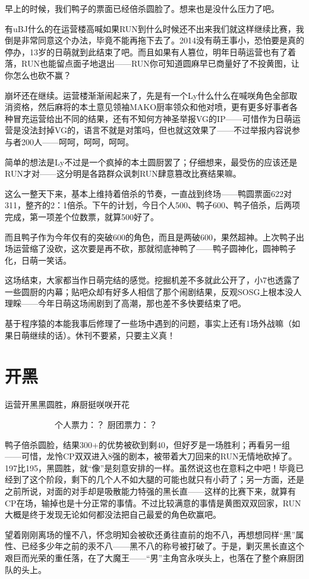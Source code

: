 早上的时候，我们鸭子的票面已经倍杀圆脸了。想来也是没什么压力了吧。

有uBJ什么的在运营楼高喊如果RUN到什么时候还不出来我们就这样继续比赛，我倒是非常同意这个办法，毕竟不能再拖下去了。2014没有萌王事小，恐怕要是真的停办，13岁的日萌就到此结束了吧。而且如果有人篡位，明年日萌运营也有了着落，RUN也能留点面子地退出——RUN你可知道圆麻早已商量好了不投黄图，让你怎么也砍不赢？

崩坏还在继续。运营楼渐渐闹起来了，先是有一个Ly什么什么在喊咲角色全部取消资格，然后麻将的本土意见领袖MAKO厨率领众和他对喷，更有更多好事者各种冒充运营给出不同的结果，还有不知何方神圣举报VG的IP——可惜作为日萌运营是没法封掉VG的，语言不就是对策吗，但也就这效果了——不过举报内容说参与者200人——呵呵，呵呵，呵呵。

简单的想法是Ly不过是一个疯掉的本土圆厨罢了；仔细想来，最受伤的应该还是RUN才对——这分明是各路群众讽刺RUN肆意篡改比赛结果嘛。

这么一整天下来，基本上维持着倍杀的节奏，一直战到终场——鸭圆票面622对311，整齐的2：1倍杀。下午的计划，今日个人500、鸭子600、鸭子倍杀，后两项完成，第一项差个位数票，就算500好了。

而且鸭子作为今年仅有的突破600的角色，而且是两破600，果然超神。上次鸭子出场运营缩了没砍，这次要是再不砍，那就彻底神鸭了——鸭子圆神化，圆神鸭子化，日萌一笑话。

这场结束，大家都当作日萌完结的感觉。挖掘机差不多就此公开了，小7也透露了一些圆厨的内幕；贴吧众却有好多人相信了那个闹剧结果，反观SOSG上根本没人理睬——今年日萌这场闹剧到了高潮，那也差不多快要结束了吧。

基于程序猿的本能我事后修理了一些场中遇到的问题，事实上还有1场外战嘛（如果日萌继续的话）。休刊不要紧，只要主义真！


\section{开黑}
运营开黑黑圆胜，麻厨挺咲咲开花

　　　　　　个人票力：？ 厨团票力：？

鸭子倍杀圆脸，结果300+的优势被砍到剩40，但好歹是一场胜利；再看另一组——可惜，龙怜CP双双进入8强的剧本，被带着大刀回来的RUN无情地砍掉了。197比195，黑圆胜，就“像”是刻意安排的一样。虽然说这也在意料之中吧！毕竟已经到了这个阶段，剩下的几个人不如大腿的可能也就只有小莳了；另一方面，还是之前所说，对面的对手却是吸散能力特强的黑长直——这样的比赛下来，就算有CP在场，输掉也是十分正常的事情。不过比较满意的事情是黄图双双回家，RUN大概是终于发现无论如何都没法把自己最爱的角色砍赢吧。

望着刚刚离场的憧不八，怀念明知会被砍还勇往直前的炮不八，再想想同样“黑”属性、已经多少年之前的汞不八——黑不八的称号被打破了。于是，剿灭黑长直这个艰巨而光荣的重任落，在了大魔王——“男”主角宫永咲头上，也落在了整个麻厨团队的头上。

